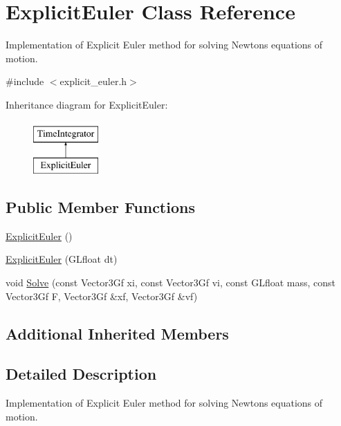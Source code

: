 \hypertarget{classExplicitEuler}{}\section{Explicit\+Euler Class Reference}
\label{classExplicitEuler}


Implementation of Explicit Euler method for solving Newton\textquotesingle{}s equations of motion.  




{\ttfamily \#include $<$explicit\+\_\+euler.\+h$>$}

Inheritance diagram for Explicit\+Euler\+:\begin{figure}[H]
\begin{center}
\leavevmode
\includegraphics[height=2.000000cm]{classExplicitEuler}
\end{center}
\end{figure}
\subsection*{Public Member Functions}
\begin{DoxyCompactItemize}
\item 
\hyperlink{classExplicitEuler_aa16df6a77bb175fdd6291c302cb61d17}{Explicit\+Euler} ()
\item 
\hyperlink{classExplicitEuler_ab7ba8cf17d34831178c47a3a3711c3b0}{Explicit\+Euler} (G\+Lfloat dt)
\item 
void \hyperlink{classExplicitEuler_aee3f98264fab0eac7517d9dc8487ecb4}{Solve} (const Vector3\+Gf xi, const Vector3\+Gf vi, const G\+Lfloat mass, const Vector3\+Gf F, Vector3\+Gf \&xf, Vector3\+Gf \&vf)
\end{DoxyCompactItemize}
\subsection*{Additional Inherited Members}


\subsection{Detailed Description}
Implementation of Explicit Euler method for solving Newton\textquotesingle{}s equations of motion. 

